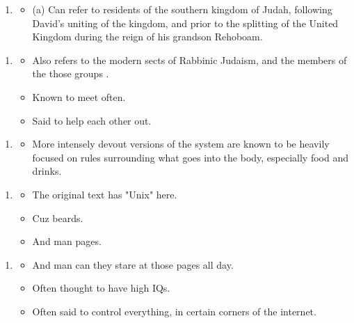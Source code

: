 \Sentence
{ \hX{} }
{ \eX{} }
{
\begin{enumerate}
\item[]
\begin{itemize}
\item (a) Can refer to residents of the southern kingdom of Judah, following David's uniting of the kingdom, and prior to the splitting of the United Kingdom during the reign of his grandson Rehoboam.
\end{itemize}
\end{enumerate}
}

\Sentence
{ \hX{} }
{ \eX{} }
{
\begin{enumerate}
\item[]
\begin{itemize}
\item Also refers to the modern sects of Rabbinic Judaism, and the members of the those groups .
\item Known to meet often.
\item Said to help each other out.
\end{itemize}
\end{enumerate}
}

\Sentence
{ \hX{} }
{ \eX{} }
{
\begin{enumerate}
\item[]
\begin{itemize}
\item More intensely devout versions of the system are known to be heavily focused on rules surrounding what goes into the body, especially food and drinks.
\end{itemize}
\end{enumerate}
}

\Sentence
{ \hX{} }
{ \eX{} }
{
\begin{enumerate}
\item[]
\begin{itemize}
\item The original text has "Unix" here.
\item Cuz beards.
\item And man pages.
\end{itemize}
\end{enumerate}
}

\Sentence
{ \hX{} }
{ \eX{} }
{
\begin{enumerate}
\item[]
\begin{itemize}
\item And man can they stare at those pages all day.
\item Often thought to have high IQs.
\item Often said to control everything, in certain corners of the internet.
\end{itemize}
\end{enumerate}
}

